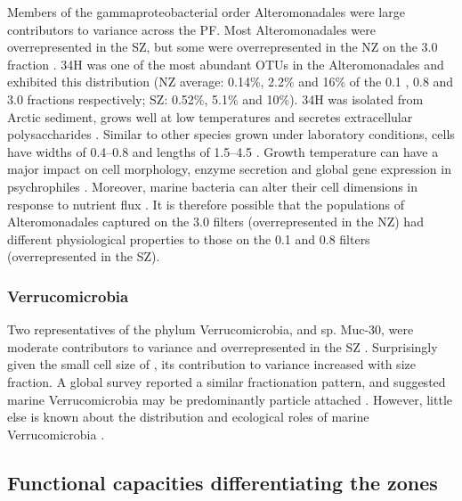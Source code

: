 Members of the gammaproteobacterial order Alteromonadales were large contributors to variance across the \ac{PF}.
Most Alteromonadales were overrepresented in the \ac{SZ}, but some were overrepresented in the \ac{NZ} on the 3.0 \micron{} fraction .
 34H was one of the most abundant \acp{OTU} in the Alteromonadales and exhibited this distribution (\ac{NZ} average: 0.14\%, 2.2\% and 16\% of the 0.1 \micron{}, 0.8 \micron{} and 3.0 \micron{} fractions respectively; \ac{SZ}: 0.52\%, 5.1\% and 10\%).
 34H was isolated from Arctic sediment, grows well at low temperatures and secretes extracellular polysaccharides \cite{Huston:2000jr,Junge:2003kb,Methe:2005uf}.
Similar to other  species grown under laboratory conditions,  cells have widths of 0.4--0.8 \micron{} and lengths of 1.5--4.5 \micron{} \cite{Jung:2006fh}.
Growth temperature can have a major impact on cell morphology, enzyme secretion and global gene expression in psychrophiles \citep[e.g.][]{Feller:2003ir,Junge:2003kb,Williams:2011hy,Cavicchioli:2006bl,Campanaro:2011gj}.
Moreover, marine bacteria can alter their cell dimensions in response to nutrient flux \citep[e.g.][]{Kjelleberg:1987wp}.
It is therefore possible that the populations of Alteromonadales captured on the 3.0 \micron{} filters (overrepresented in the \ac{NZ}) had different physiological properties to those on the 0.1 and 0.8 \micron{} filters (overrepresented in the \ac{SZ}).

\subsubsection{Verrucomicrobia}

Two representatives of the phylum Verrucomicrobia,  and  sp. Muc-30, were moderate contributors to variance and overrepresented in the \ac{SZ} .
Surprisingly given the small cell size of  \cite{Yoon:2007ic}, its contribution to variance increased with size fraction.
A global survey reported a similar fractionation pattern, and suggested marine Verrucomicrobia may be predominantly particle attached \cite{Freitas:2012jz}.
However, little else is known about the distribution and ecological roles of marine Verrucomicrobia \cite{Freitas:2012jz}.

\subsection{Functional capacities differentiating the zones}

